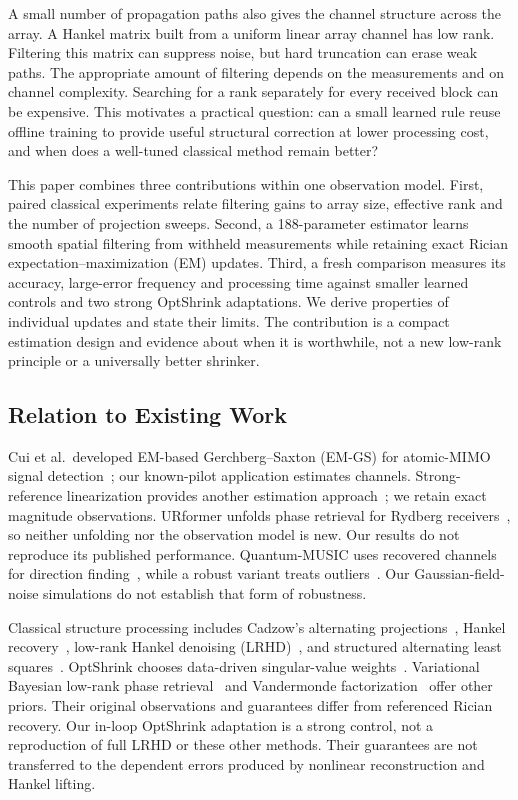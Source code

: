 \documentclass[10pt,journal,letterpaper]{IEEEtran}
\begin{document}
A small number of propagation paths also gives the channel structure across the array. A Hankel matrix built from a uniform linear array channel has low rank. Filtering this matrix can suppress noise, but hard truncation can erase weak paths. The appropriate amount of filtering depends on the measurements and on channel complexity. Searching for a rank separately for every received block can be expensive. This motivates a practical question: can a small learned rule reuse offline training to provide useful structural correction at lower processing cost, and when does a well-tuned classical method remain better?

This paper combines three contributions within one observation model. First, paired classical experiments relate filtering gains to array size, effective rank and the number of projection sweeps. Second, a 188-parameter estimator learns smooth spatial filtering from withheld measurements while retaining exact Rician expectation--maximization (EM) updates. Third, a fresh comparison measures its accuracy, large-error frequency and processing time against smaller learned controls and two strong OptShrink adaptations. We derive properties of individual updates and state their limits. The contribution is a compact estimation design and evidence about when it is worthwhile, not a new low-rank principle or a universally better shrinker.

\subsection{Relation to Existing Work}
Cui et al.\ developed EM-based Gerchberg--Saxton (EM-GS) for atomic-MIMO signal detection~\cite{cui2025}; our known-pilot application estimates channels. Strong-reference linearization provides another estimation approach~\cite{xu2025}; we retain exact magnitude observations. URformer unfolds phase retrieval for Rydberg receivers~\cite{xiao2026}, so neither unfolding nor the observation model is new. Our results do not reproduce its published performance. Quantum-MUSIC uses recovered channels for direction finding~\cite{kim2025quantummusic}, while a robust variant treats outliers~\cite{banerjee2026robust}. Our Gaussian-field-noise simulations do not establish that form of robustness.

Classical structure processing includes Cadzow's alternating projections~\cite{cadzow1988}, Hankel recovery~\cite{chen2014emac}, low-rank Hankel denoising (LRHD)~\cite{yin2021}, and structured alternating least squares~\cite{zachariah2012}. OptShrink chooses data-driven singular-value weights~\cite{nadakuditi2014}. Variational Bayesian low-rank phase retrieval~\cite{liu2018lrpr} and Vandermonde factorization~\cite{ying2018hvaf} offer other priors. Their original observations and guarantees differ from referenced Rician recovery. Our in-loop OptShrink adaptation is a strong control, not a reproduction of full LRHD or these other methods. Their guarantees are not transferred to the dependent errors produced by nonlinear reconstruction and Hankel lifting.
\end{document}
